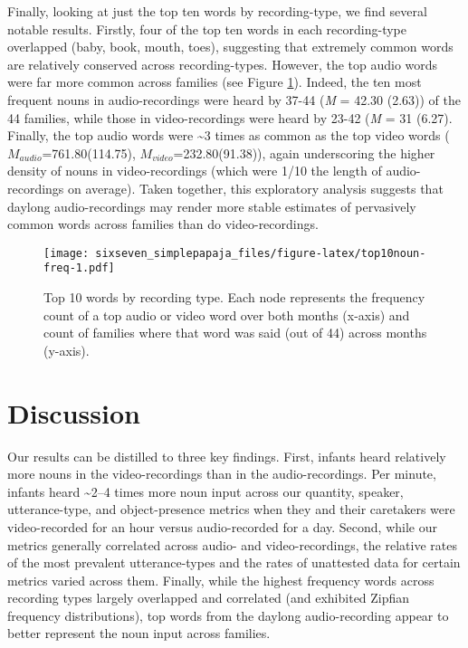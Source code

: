 \documentclass[floatsintext,man]{apa6}
\theoremstyle{definition}
\theoremstyle{definition}
\theoremstyle{definition}
\theoremstyle{remark}
\begin{document}
Finally, looking at just the top ten words by recording-type, we find
several notable results. Firstly, four of the top ten words in each
recording-type overlapped (baby, book, mouth, toes), suggesting that
extremely common words are relatively conserved across recording-types.
However, the top audio words were far more common across families (see
Figure \ref{fig:top10noun-freq}). Indeed, the ten most frequent nouns in
audio-recordings were heard by 37-44 (\emph{M} = 42.30 (2.63)) of the 44
families, while those in video-recordings were heard by 23-42 (\emph{M}
= 31 (6.27). Finally, the top audio words were \textasciitilde{}3 times
as common as the top video words (\(M_{audio}\)=761.80(114.75),
\(M_{video}\)=232.80(91.38)), again underscoring the higher density of
nouns in video-recordings (which were 1/10 the length of
audio-recordings on average). Taken together, this exploratory analysis
suggests that daylong audio-recordings may render more stable estimates
of pervasively common words across families than do video-recordings.

\begin{figure}
\centering
\texttt{[image: sixseven\_simplepapaja\_files/figure-latex/top10noun-freq-1.pdf]}
\caption{\label{fig:top10noun-freq}Top 10 words by recording type. Each node
represents the frequency count of a top audio or video word over both
months (x-axis) and count of families where that word was said (out of
44) across months (y-axis).}
\end{figure}

\hypertarget{discussion}{%
\section{Discussion}\label{discussion}}

Our results can be distilled to three key findings. First, infants heard
relatively more nouns in the video-recordings than in the
audio-recordings. Per minute, infants heard \textasciitilde{}2--4 times
more noun input across our quantity, speaker, utterance-type, and
object-presence metrics when they and their caretakers were
video-recorded for an hour versus audio-recorded for a day. Second,
while our metrics generally correlated across audio- and
video-recordings, the relative rates of the most prevalent
utterance-types and the rates of unattested data for certain metrics
varied across them. Finally, while the highest frequency words across
recording types largely overlapped and correlated (and exhibited Zipfian
frequency distributions), top words from the daylong audio-recording
appear to better represent the noun input across families.
\end{document}
